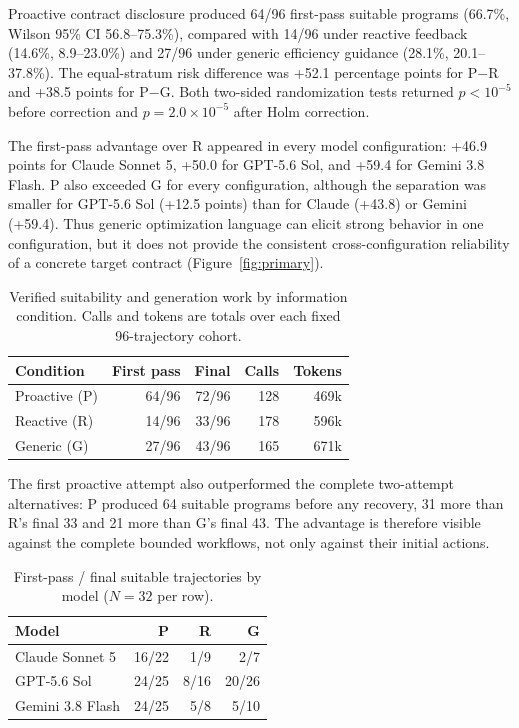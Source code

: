 \documentclass[sigconf,anonymous]{aamas}
\begin{document}
Proactive contract disclosure produced 64/96 first-pass suitable programs
(66.7\%, Wilson 95\% CI 56.8--75.3\%), compared with 14/96 under reactive
feedback (14.6\%, 8.9--23.0\%) and 27/96 under generic efficiency guidance
(28.1\%, 20.1--37.8\%). The equal-stratum risk difference was +52.1 percentage
points for P$-$R and +38.5 points for P$-$G. Both two-sided randomization tests
returned $p<10^{-5}$ before correction and $p=2.0\times10^{-5}$ after Holm
correction.

The first-pass advantage over R appeared in every model configuration: +46.9
points for Claude Sonnet 5, +50.0 for GPT-5.6 Sol, and +59.4 for Gemini 3.8
Flash. P also exceeded G for every configuration, although the separation was
smaller for GPT-5.6 Sol (+12.5 points) than for Claude (+43.8) or Gemini (+59.4).
Thus generic optimization language can elicit strong behavior in one
configuration, but it does not provide the consistent cross-configuration
reliability of a concrete target contract (Figure~\ref{fig:primary}).

\begin{table}[t]
  \caption{Verified suitability and generation work by information condition.
  Calls and tokens are totals over each fixed 96-trajectory cohort.}
  \label{tab:primary}
  \centering
  \small
  \begin{tabular}{lrrrr}\toprule
  Condition & First pass & Final & Calls & Tokens \\\midrule
  Proactive (P) & 64/96 & 72/96 & 128 & 469k \\
  Reactive (R) & 14/96 & 33/96 & 178 & 596k \\
  Generic (G) & 27/96 & 43/96 & 165 & 671k \\\bottomrule
  \end{tabular}
\end{table}

The first proactive attempt also outperformed the complete two-attempt
alternatives: P produced 64 suitable programs before any recovery, 31 more than
R's final 33 and 21 more than G's final 43. The advantage is therefore visible
against the complete bounded workflows, not only against their initial actions.

\begin{table}[t]
  \caption{First-pass / final suitable trajectories by model ($N=32$ per row).}
  \label{tab:model}
  \centering
  \small
  \begin{tabular}{lrrr}\toprule
  Model & P & R & G \\\midrule
  Claude Sonnet 5 & 16/22 & 1/9 & 2/7 \\
  GPT-5.6 Sol & 24/25 & 8/16 & 20/26 \\
  Gemini 3.8 Flash & 24/25 & 5/8 & 5/10 \\\bottomrule
  \end{tabular}
\end{table}
\end{document}
